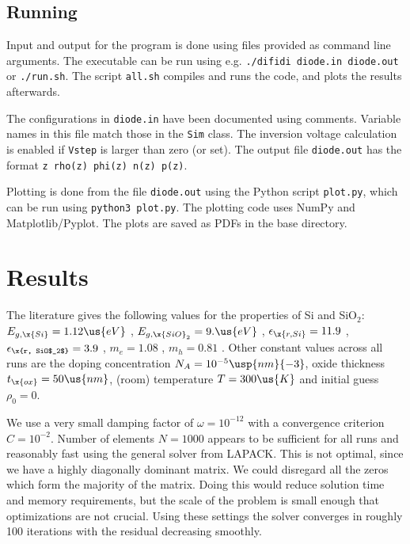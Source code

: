 \documentclass[10pt]{article}
\begin{document}
\subsection*{Running}
Input and output for the program is done using files provided as command line arguments. The executable can be run using e.g. \verb|./difidi diode.in diode.out| or \verb|./run.sh|. The script \verb|all.sh| compiles and runs the code, and plots the results afterwards. 

The configurations in \verb|diode.in| have been documented using comments. Variable names in this file match those in the \verb|Sim| class. The inversion voltage calculation is enabled if \verb|Vstep| is larger than zero (or set). The output file \verb|diode.out| has the format \verb|z rho(z) phi(z) n(z) p(z)|.

Plotting is done from the file \verb|diode.out| using the Python script \verb|plot.py|, which can be run using \verb|python3 plot.py|. The plotting code uses NumPy and Matplotlib/Pyplot. The plots are saved as PDFs in the base directory.

\section{Results}

The literature gives the following values for the properties of Si and SiO$_2$: $E_{g, \x{Si}} = 1.12 \us{eV}$ \cite{sze}, $E_{g, \x{SiO}_2} = 9. \us{eV}$ \cite{sze}, $\epsilon_\x{r, Si} = 11.9$ \cite{sze}, $\epsilon_\x{r, SiO$_2$} = 3.9$ \cite{sze}, $m_e = 1.08$ \cite{van}, $m_h = 0.81$ \cite{van}. Other constant values across all runs are the doping concentration $N_A = 10^{-5} \usp{nm}{-3}$, oxide thickness $t_\x{ox} = 50 \us{nm}$, (room) temperature $T = 300 \us{K}$ and initial guess $\rho_0 = 0$.

We use a very small damping factor of $\omega = 10^{-12}$ with a convergence criterion $C = 10^{-2}$. Number of elements $N = 1000$ appears to be sufficient for all runs and reasonably fast using the general solver from LAPACK. This is not optimal, since we have a highly diagonally dominant matrix. We could disregard all the zeros which form the majority of the matrix. Doing this would reduce solution time and memory requirements, but the scale of the problem is small enough that optimizations are not crucial. Using these settings the solver converges in roughly 100 iterations with the residual decreasing smoothly.
\end{document}
